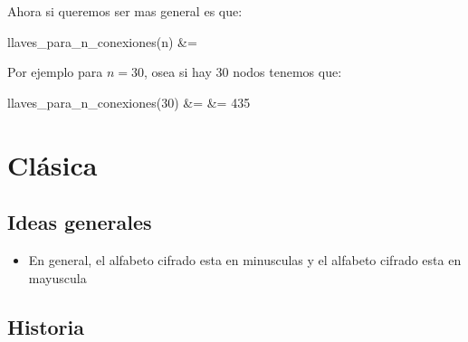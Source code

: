 \documentclass[12pt, fleqn]{report}                             %
\def \Eq {equation}                                             %
\newenvironment{MultiLineEquation*}[1]                          %
        {\begin{\Eq*}\begin{alignedat}{#1}}                         %
        {\end{alignedat}\end{\Eq*}}                                 %
\theoremstyle{break}                                            %
\begin{document}
            Ahora si queremos ser mas general es que:
            \begin{MultiLineEquation*}{3}
                llaves\_para\_n\_conexiones(n) 
                    &= 
            \end{MultiLineEquation*}

            Por ejemplo para $n = 30$, osea si hay 30 nodos tenemos que:
            \begin{MultiLineEquation*}{3}
                llaves\_para\_n\_conexiones(30) 
                    &=    
                    &= 435
            \end{MultiLineEquation*}




\part{Clásica}

    \chapter{Ideas generales}

        \begin{itemize}
            \item En general, el alfabeto cifrado esta en minusculas y el alfabeto cifrado esta en mayuscula
        \end{itemize}

    \chapter{Historia}
\end{document}
